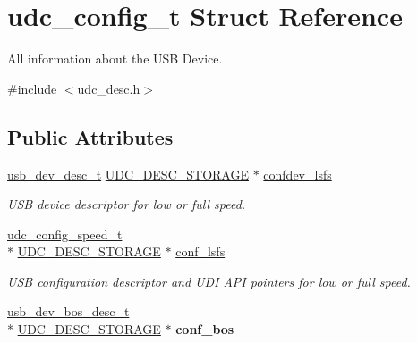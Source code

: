 \hypertarget{structudc__config__t}{\section{udc\-\_\-config\-\_\-t Struct Reference}
\label{structudc__config__t}
}


All information about the U\-S\-B Device.  




{\ttfamily \#include $<$udc\-\_\-desc.\-h$>$}

\subsection*{Public Attributes}
\begin{DoxyCompactItemize}
\item 
\hypertarget{structudc__config__t_abbb89807817f4e602e20c6ebdfb26741}{\hyperlink{structusb__dev__desc__t}{usb\-\_\-dev\-\_\-desc\-\_\-t} \hyperlink{group__udc__desc__group_gae086959cec07a2e71ab069e25a51764f}{U\-D\-C\-\_\-\-D\-E\-S\-C\-\_\-\-S\-T\-O\-R\-A\-G\-E} $\ast$ \hyperlink{structudc__config__t_abbb89807817f4e602e20c6ebdfb26741}{confdev\-\_\-lsfs}}\label{structudc__config__t_abbb89807817f4e602e20c6ebdfb26741}

\begin{DoxyCompactList}\small\item\em U\-S\-B device descriptor for low or full speed. \end{DoxyCompactList}\item 
\hypertarget{structudc__config__t_a681102302c24cb986cdd7af3bee6d976}{\hyperlink{structudc__config__speed__t}{udc\-\_\-config\-\_\-speed\-\_\-t} \\*
\hyperlink{group__udc__desc__group_gae086959cec07a2e71ab069e25a51764f}{U\-D\-C\-\_\-\-D\-E\-S\-C\-\_\-\-S\-T\-O\-R\-A\-G\-E} $\ast$ \hyperlink{structudc__config__t_a681102302c24cb986cdd7af3bee6d976}{conf\-\_\-lsfs}}\label{structudc__config__t_a681102302c24cb986cdd7af3bee6d976}

\begin{DoxyCompactList}\small\item\em U\-S\-B configuration descriptor and U\-D\-I A\-P\-I pointers for low or full speed. \end{DoxyCompactList}\item 
\hypertarget{structudc__config__t_af69cd3c423019357d4493c3567fe5d65}{\hyperlink{structusb__dev__bos__desc__t}{usb\-\_\-dev\-\_\-bos\-\_\-desc\-\_\-t} \\*
\hyperlink{group__udc__desc__group_gae086959cec07a2e71ab069e25a51764f}{U\-D\-C\-\_\-\-D\-E\-S\-C\-\_\-\-S\-T\-O\-R\-A\-G\-E} $\ast$ {\bfseries conf\-\_\-bos}}\label{structudc__config__t_af69cd3c423019357d4493c3567fe5d65}

\end{DoxyCompactItemize}


